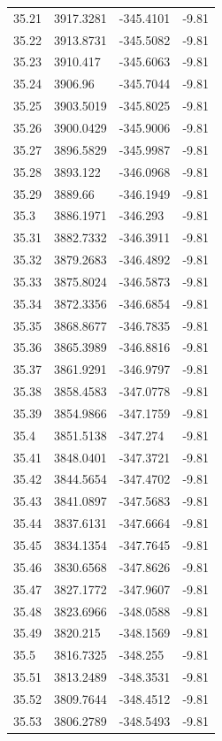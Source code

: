 \begin{table}[H]
\begin{tabular}{llll}
35.21 & 3917.3281 & -345.4101 & -9.81 \\
35.22 & 3913.8731 & -345.5082 & -9.81 \\
35.23 & 3910.417 & -345.6063 & -9.81 \\
35.24 & 3906.96 & -345.7044 & -9.81 \\
35.25 & 3903.5019 & -345.8025 & -9.81 \\
35.26 & 3900.0429 & -345.9006 & -9.81 \\
35.27 & 3896.5829 & -345.9987 & -9.81 \\
35.28 & 3893.122 & -346.0968 & -9.81 \\
35.29 & 3889.66 & -346.1949 & -9.81 \\
35.3 & 3886.1971 & -346.293 & -9.81 \\
35.31 & 3882.7332 & -346.3911 & -9.81 \\
35.32 & 3879.2683 & -346.4892 & -9.81 \\
35.33 & 3875.8024 & -346.5873 & -9.81 \\
35.34 & 3872.3356 & -346.6854 & -9.81 \\
35.35 & 3868.8677 & -346.7835 & -9.81 \\
35.36 & 3865.3989 & -346.8816 & -9.81 \\
35.37 & 3861.9291 & -346.9797 & -9.81 \\
35.38 & 3858.4583 & -347.0778 & -9.81 \\
35.39 & 3854.9866 & -347.1759 & -9.81 \\
35.4 & 3851.5138 & -347.274 & -9.81 \\
35.41 & 3848.0401 & -347.3721 & -9.81 \\
35.42 & 3844.5654 & -347.4702 & -9.81 \\
35.43 & 3841.0897 & -347.5683 & -9.81 \\
35.44 & 3837.6131 & -347.6664 & -9.81 \\
35.45 & 3834.1354 & -347.7645 & -9.81 \\
35.46 & 3830.6568 & -347.8626 & -9.81 \\
35.47 & 3827.1772 & -347.9607 & -9.81 \\
35.48 & 3823.6966 & -348.0588 & -9.81 \\
35.49 & 3820.215 & -348.1569 & -9.81 \\
35.5 & 3816.7325 & -348.255 & -9.81 \\
35.51 & 3813.2489 & -348.3531 & -9.81 \\
35.52 & 3809.7644 & -348.4512 & -9.81 \\
35.53 & 3806.2789 & -348.5493 & -9.81 \\

\end{tabular}
\end{table}
